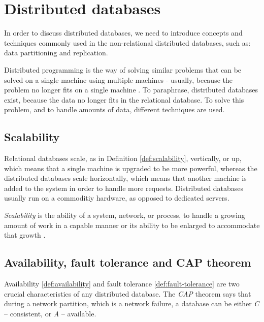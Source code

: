 
\section{Distributed databases}\label{sec:theory:distDbs}
In order to discuss distributed databases, we need to introduce concepts and techniques commonly used in the non-relational distributed databases, such as: data partitioning and replication.

Distributed programming is the way of solving similar problems that can be solved on a single machine using multiple machines - usually, because the problem no longer fits on a single machine \cite{DistributeSystemsForFunAndProfit}.  To paraphrase, distributed databases exist, because the data no longer fits in the relational database. To solve this problem, and to handle amounts of data, different techniques are used.


\subsection{Scalability}
Relational databases scale, as in Definition \ref{def:scalability}, vertically, or up, which means that a single machine is upgraded to be more powerful, whereas the distributed databases scale horizontally, which means that another machine is added to the system in order to handle more requests. Distributed databases usually run on a commoditiy hardware, as opposed to dedicated servers.

\begin{definition}
  \label{def:scalability}
  \emph{Scalability} is the ability of a system, network, or process, to handle a growing amount of work in a capable manner or its ability to be enlarged to accommodate that growth \cite{DistributeSystemsForFunAndProfit}. 
\end{definition}


\subsection{Availability, fault tolerance and CAP theorem}
Availability \ref{def:availability} and fault tolerance \ref{def:fault-tolerance} are two crucial characteristics of any distributed database. The \emph{CAP} theorem \cite{brewer2000towards} \cite{Brewer:2012ba} says that during a network partition, which is a network failure, a database can be either \emph{C} -- consistent, or \emph{A} -- available. 

